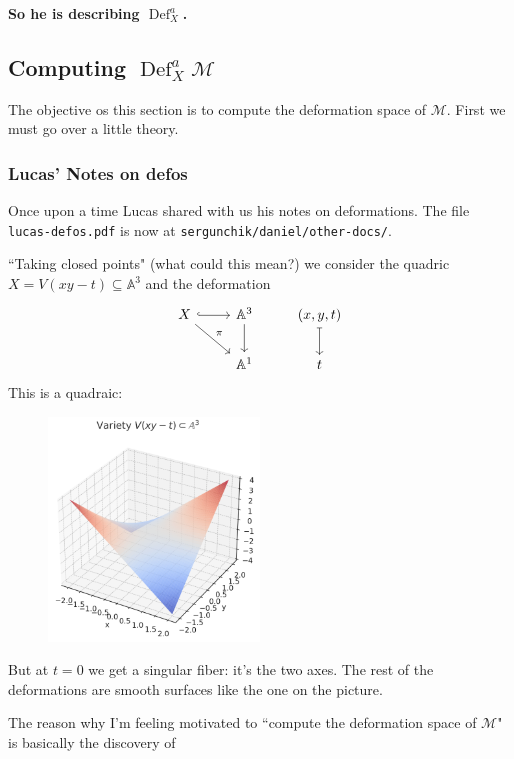 {\color{8}\bfseries So he is describing $\operatorname{Def}^a_X$.}\hspace{.5em}

\subsection{Computing \(\operatorname{Def}^a_X\mathcal{M}\)}

The objective os this section is to compute the deformation space of \(\mathcal{M}\). First we must go over a little theory.

\subsubsection{Lucas' Notes on defos}

Once upon a time Lucas shared with us his notes on deformations. The file \texttt{lucas-defos.pdf} is now at \texttt{sergunchik/daniel/other-docs/}.

\begin{example}\leavevmode
``Taking closed points" (what could this mean?) we consider the quadric \(X=V(xy-t) \subseteq \mathbb{A}^3\) and the deformation
\[\begin{tikzcd}
	X \arrow[r,hook ]\arrow[dr,"\pi"]&\mathbb{A}^3\arrow[d]& (x,y,t)\arrow[d,maps to ]\\
	&\mathbb{A}^1&t
\end{tikzcd}\]
This is a quadraic:
\begin{figure}[H]
	\centering
	\includegraphics[width=0.5\textwidth]{fig4}
\end{figure}
But at \(t=0\) we get a singular fiber: it's the two axes. The rest of the deformations are smooth surfaces like the one on the picture.
\end{example} 

The reason why I'm feeling motivated to ``compute the deformation space of \(\mathcal{M}\)" is basically the discovery of

